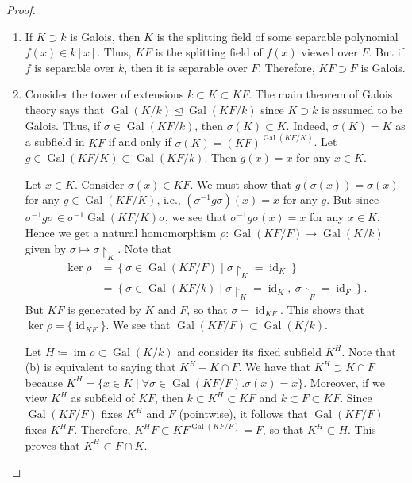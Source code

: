 \documentclass[10pt,letterpaper,cm]{nupset}
\theoremstyle{definition}
\theoremstyle{theorem}
\theoremstyle{remark}
\newcommand{\1}{\mathbf{1}}
\newcommand{\0}{\vec 0}
\DeclareMathOperator{\id}{id}
\DeclareMathOperator{\gal}{Gal}
\DeclareMathOperator{\im}{im}
\begin{document}
\begin{proof} $ $
\begin{enumerate}[label=(\alph*)]
\item  If $K\supset k$ is Galois, then $K$ is the splitting field of some separable polynomial $f(x) \in k[x]$. Thus, $KF$ is the splitting field of $f(x)$ viewed over $F$. But if $f$ is separable over $k$, then it is separable over $F$. Therefore, $KF \supset F$ is Galois.
\item Consider the tower of extensions $k \subset K \subset KF$. The main theorem of Galois theory says that $\gal(K/k) \unlhd \gal(KF/k)$ since $K\supset k$ is assumed to be Galois. Thus, if $\sigma \in \gal(KF/k)$, then $\sigma(K) \subset K$. Indeed, $\sigma(K) = K$ as a subfield in $KF$ if and only if $\sigma(K) = (KF)^{\gal(KF/K)}$. Let $g\in \gal(KF/K) \subset \gal(KF/k)$. Then $g(x) = x$ for any $x\in K$. 

Let $x\in K$. Consider $\sigma(x) \in KF$.  We must show that $g(\sigma(x)) = \sigma(x)$ for any $g \in \gal(KF/K)$, i.e., $(\sigma^{-1}{g}{\sigma})(x) = x$ for any $g$. But since $\sigma^{-1}{g}{\sigma} \in \sigma^{-1}{\gal(KF/K)}{\sigma}$, we see that $\sigma^{-1}{g}{\sigma}(x) = x$ for any $x\in K$. Hence we get a natural homomorphism $ \rho : \gal(KF/F) \to \gal(K/k)$ given by $\sigma \mapsto \sigma \restriction_K$.  Note that \begin{align*} \ker{\rho} & = \left\{\sigma \in \gal(KF/F) \mid \sigma \restriction_K = \id_K\right\}
\\ & = \left\{\sigma \in \gal(KF/k) \mid \sigma \restriction_K = \id_K, \ \sigma \restriction_F = \id_F\right\}.
\end{align*}  But $KF$ is generated by $K$ and $F$, so that $\sigma = \id_{KF}$. This shows that $\ker{\rho} = \{\id_{KF}\}$. We see that $\gal(KF/F) \subset \gal(K/k)$. 

Let $H \coloneqq  \im{\rho} \subset \gal(K/k)$ and consider its fixed subfield $K^H$. Note that (b) is equivalent to saying that $K^H - K \cap F$. We have that $K^H \supset K \cap F$ because $K^H = \{x\in K \mid \forall \sigma \in \gal(KF/F).\sigma(x) =x\}$. Moreover, if we view $K^H$ as subfield of $KF$, then $k \subset K^H \subset KF$ and $k \subset F \subset KF$.  Since $\gal(KF/F)$ fixes $K^H$ and $F$ (pointwise), it follows that $\gal(KF/F)$ fixes $K^HF$. Therefore, $K^HF \subset KF^{\gal(KF/F)} = F$, so that $K^H \subset H$. This proves that $K^H \subset F \cap K$. 
\end{enumerate}
\end{proof}
\end{document}
